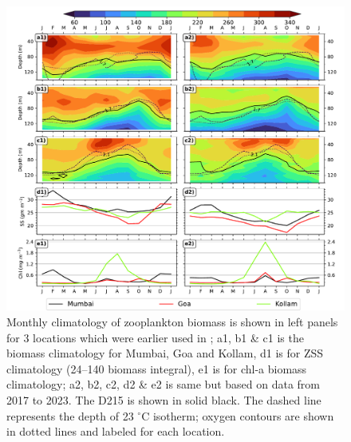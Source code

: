 \documentclass[12pt,a4paper]{article}
\begin{document}
\newpage


\begin{figure}[htbp]
	\centering
	\includegraphics[width=\textwidth]{./figures/climatology_comparison_aparna_ranjan.pdf} 
	\caption{Monthly climatology of zooplankton biomass is shown in left panels for 3 locations which were earlier used in \citep{aparna2022seasonal}; a1, b1 \& c1 is the biomass climatology for Mumbai, Goa and Kollam, d1 is for ZSS climatology (24--140 biomass integral), e1 is for chl-a biomass climatology; a2, b2, c2, d2 \& e2 is same but based on data from 2017 to 2023. The D215 is shown in solid black. The dashed line represents the depth of 23 $^\circ$C isotherm; oxygen contours are shown in dotted lines and labeled for each location.}
	\label{fig:zsschlclimcomp}
\end{figure}
\end{document}
